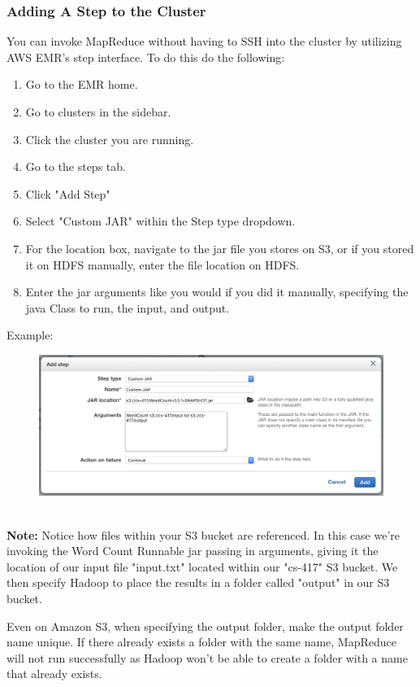 \documentclass{article}
\begin{document}
\subsubsection{Adding A Step to the Cluster}
You can invoke MapReduce without having to SSH into the cluster by utilizing AWS EMR's step interface. To do this do the following:
\begin{enumerate}
    \item Go to the EMR home.
    \item Go to clusters in the sidebar. 
    \item Click the cluster you are running. 
    \item Go to the steps tab.
    \item Click "Add Step"
    \item Select "Custom JAR" within the Step type dropdown.
    \item For the location box, navigate to the jar file you stores on S3, or if you stored it on HDFS manually, enter the file location on HDFS.
    \item Enter the jar arguments like you would if you did it manually, specifying the java Class to run, the input, and output.
\end{enumerate}
Example:
\begin{figure}[h!]
 \centering
 \includegraphics[width=150mm]{images/step}
\end{figure} 
\-\ \\\textbf{Note:} Notice how files within your S3 bucket are referenced. In this case we're invoking the Word Count Runnable jar passing in arguments, giving it the location of our input file "input.txt" located within our "cs-417" S3 bucket. We then specify Hadoop to place the results in a folder called "output" in our S3 bucket.

\begin{info}
Even on Amazon S3, when specifying the output folder, make the output folder name unique. If there already exists a folder with the same name, MapReduce will not run successfully as Hadoop won't be able to create a folder with a name that already exists.
\end{info}
\end{document}
